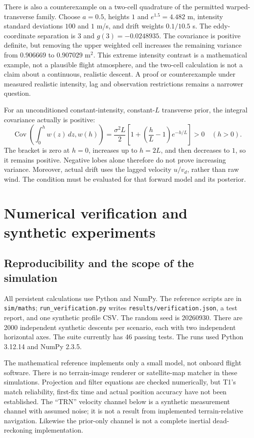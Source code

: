 \documentclass[11pt,a4paper]{article}
\numberwithin{equation}{section}
\begin{document}
There is also a counterexample on a two-cell quadrature of the permitted warped-transverse family. Choose $a=0.5$, heights $1$ and $e^{1.5}=4.482$ m, intensity standard deviations $100$ and $1$ m/s, and drift weights $0.1/10.5$ s. The eddy-coordinate separation is $3$ and $g(3)=-0.0248935$. The covariance is positive definite, but removing the upper weighted cell increases the remaining variance from $0.906669$ to $0.907029$ m$^2$. This extreme intensity contrast is a mathematical example, not a plausible flight atmosphere, and the two-cell calculation is not a claim about a continuous, realistic descent. A proof or counterexample under measured realistic intensity, lag and observation restrictions remains a narrower question.

For an unconditioned constant-intensity, constant-$L$ transverse prior, the integral covariance actually is positive:
\begin{equation}
 \operatorname{Cov}\left(\int_0^h w(z)\,dz,w(h)\right)
 =\frac{\sigma^2 L}{2}\left[1+\left(\frac hL-1\right)e^{-h/L}\right]>0\quad(h>0).
\end{equation}
The bracket is zero at $h=0$, increases up to $h=2L$, and then decreases to $1$, so it remains positive. Negative lobes alone therefore do not prove increasing variance. Moreover, actual drift uses the lagged velocity $u/v_d$, rather than raw wind. The condition must be evaluated for that forward model and its posterior.



\section{Numerical verification and synthetic experiments}
\label{sec:verification}
\subsection{Reproducibility and the scope of the simulation}
All persistent calculations use Python and NumPy. The reference scripts are in \texttt{sim/maths}; \texttt{run\_verification.py} writes \texttt{results/verification.json}, a test report, and one synthetic profile CSV. The random seed is 20260930. There are 2000 independent synthetic descents per scenario, each with two independent horizontal axes. The suite currently has 46 passing tests. The runs used Python 3.12.14 and NumPy 2.3.5.

The mathematical reference implements only a small model, not onboard flight software. There is no terrain-image renderer or satellite-map matcher in these simulations. Projection and filter equations are checked numerically, but T1's match reliability, first-fix time and actual position accuracy have not been established. The ``TRN'' velocity channel below is a synthetic measurement channel with assumed noise; it is not a result from implemented terrain-relative navigation. Likewise the prior-only channel is not a complete inertial dead-reckoning implementation.
\end{document}
